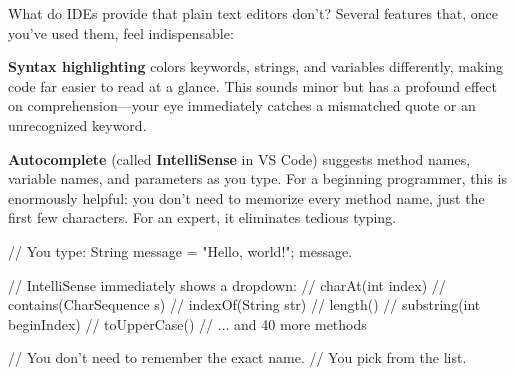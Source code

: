 \documentclass[11pt,letterpaper]{article}
\newcommand{\keyterm}[1]{\textbf{\textcolor{cssecondary}{#1}}}
\begin{document}
What do IDEs provide that plain text editors don't? Several features that, once you've used them, feel indispensable:

\begin{center}
\end{center}

\textbf{Syntax highlighting} colors keywords, strings, and variables differently, making code far easier to read at a glance. This sounds minor but has a profound effect on comprehension---your eye immediately catches a mismatched quote or an unrecognized keyword.

\textbf{Autocomplete} (called \keyterm{IntelliSense} in VS Code) suggests method names, variable names, and parameters as you type. For a beginning programmer, this is enormously helpful: you don't need to memorize every method name, just the first few characters. For an expert, it eliminates tedious typing.

\begin{javacode}
// You type:
String message = "Hello, world!";
message.

// IntelliSense immediately shows a dropdown:
//   charAt(int index)
//   contains(CharSequence s)
//   indexOf(String str)
//   length()
//   substring(int beginIndex)
//   toUpperCase()
//   ... and 40 more methods

// You don't need to remember the exact name.
// You pick from the list.
\end{javacode}
\end{document}
